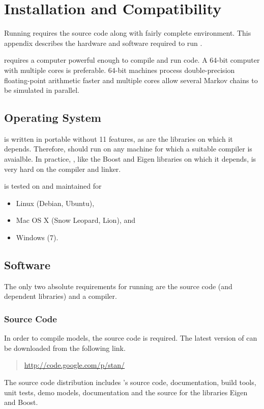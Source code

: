 \chapter{Installation and Compatibility}\label{install.appendix}

Running \Stan requires the \Stan source code along with fairly
complete \Cpp environment.  This appendix describes the hardware and
software required to run \Stan.  

\Stan requires a computer powerful enough to compile and run \Cpp
code.  A 64-bit computer with multiple cores is preferable.  64-bit
machines process double-precision floating-point arithmetic faster and
multiple cores allow several Markov chains to be simulated in parallel.

\section{Operating System}

\Stan is written in portable \Cpp without {\Cpp}11 features, as are the
libraries on which it depends.  Therefore, \Stan should run on any machine
for which a suitable \Cpp compiler is avaialble.  In practice, \Stan,
like the Boost and Eigen libraries on which it depends, is very hard
on the compiler and linker.

\Stan is tested on and maintained for
%
\begin{itemize}
\item Linux (Debian, Ubuntu), 
\item Mac OS X (Snow Leopard, Lion), and
\item Windows (7).
\end{itemize}
%

\section{Software}

The only two absolute requirements for running \Stan are the
\Stan source code (and dependent libraries) and a \Cpp compiler.

\subsection{\Stan Source Code}

In order to compile \Stan models, the \Stan source code is required.
The latest version of \Stan can be downloaded from the following link.
%
\begin{quote}
\url{http://code.google.com/p/stan/}
\end{quote}
%
The \Stan source code distribution includes \Stan's source code,
documentation, build tools, unit tests, demo models, documentation and
the source for the libraries Eigen and Boost.

